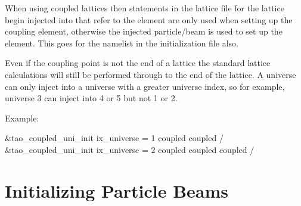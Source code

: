 {When using coupled lattices then statements in the lattice file for
the lattice begin injected into that refer to the 
element are only used when setting up the coupling element, otherwise
the injected particle/beam is used to set up the 
element. This goes for the  namelist in the
initialization file also.

Even if the coupling point is not the end of a lattice the standard lattice
calculations will still be performed through to the end of the
lattice.  A universe can only inject into a universe with a greater
universe index, so for example, universe 3 can inject into 4 or 5 but
not 1 or 2.

Example:
\begin{example}
  &tao_coupled_uni_init
    ix_universe = 1
    coupled%
    coupled%
  /
  &tao_coupled_uni_init
    ix_universe = 2
    coupled%
    coupled%
    coupled%
  /
\end{example}

\section{Initializing Particle Beams}
\label{s:beam_init}

}
